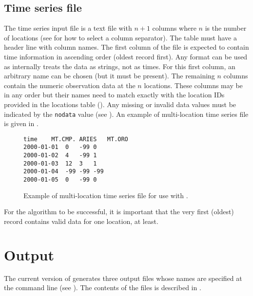 \subsection{Time series file} \label{sec:meteofill:input:timeSeries}
The time series input file is a text file with $n+1$ columns where $n$ is the number of locations (see  for how to select a column separator). The table must have a header line with column names.
The first column of the file is expected to contain time information in ascending order (oldest record first). Any format can be used as  internally treats the data as strings, not as times. For this first column, an arbitrary name can be chosen (but it must be present).
The remaining $n$ columns contain the numeric observation data at the $n$ locations. These columns may be in any order but their names need to match exactly with the location IDs provided in the locations table (). Any missing or invalid data values must be indicated by the \texttt{nodata} value (see ). An example of multi-location time series file is given in .

\begin{figure}
\begin{lstlisting}[style=txt]
time	MT.CMP.	ARIES	MT.ORO
2000-01-01	0	-99	0
2000-01-02	4	-99	1
2000-01-03	12	3	1
2000-01-04	-99	-99	-99
2000-01-05	0	-99	0
\end{lstlisting}
  \caption{Example of multi-location time series file for use with . \label{fig:meteofill:input:timeSeries}}
\end{figure}

For the algorithm to be successful, it is important that the very first (oldest) record contains valid data for one location, at least.

\section{Output} \label{sec:meteofill:output}
The current version of  generates three output files whose names are specified at the command line (see ). The contents of the files is described in .

